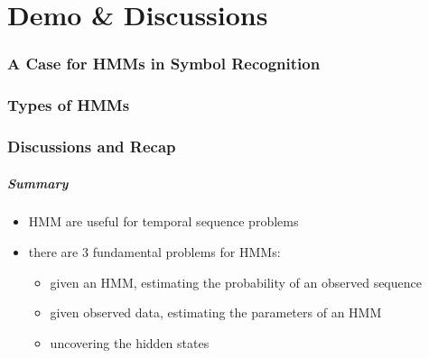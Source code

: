 \part{Demo \& Discussions}

\section{A Case for HMMs in Symbol Recognition}
\label{sec:sr}


\section{Types of HMMs}
\label{sec:types}


\section{Discussions and Recap}
\label{sec:final}

\begin{frame}
  \frametitle{Summary}
  \begin{itemize}
  \item HMM are useful for temporal sequence problems
    \pause
  \item there are 3 fundamental problems for HMMs:
    \begin{itemize}
    \item<3-> given an HMM, estimating the probability of an observed sequence
    \item<4-> given observed data, estimating the parameters of an HMM
    \item<5-> uncovering the hidden states
    \end{itemize}

  \end{itemize}
\end{frame}